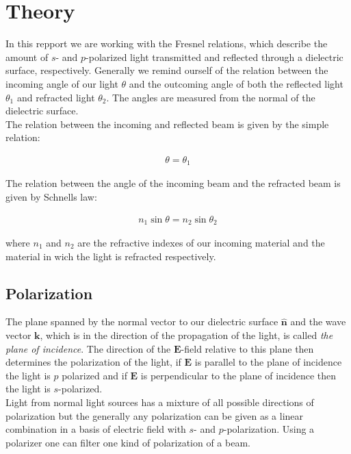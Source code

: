 \section{Theory}
In this repport we are working with the Fresnel relations, which describe the amount of $s$- and $p$-polarized light transmitted and reflected through a dielectric surface, respectively. Generally we remind ourself of the relation between the incoming angle of our light $\theta$ and the outcoming angle of both the reflected light $\theta_1$ and refracted light $\theta_2$. The angles are measured from the normal of the dielectric surface.\\

The relation between the incoming and reflected beam is given by the simple relation:

\begin{align}
\theta=\theta_1
\end{align}

The relation between the angle of the incoming beam and the refracted beam is given by Schnells law:

\begin{align}
n_1\sin{\theta}=n_2\sin{\theta_2}
\end{align}

where $n_1$ and $n_2$ are the refractive indexes of our incoming material and the material in wich the light is refracted respectively. 

\subsection{Polarization}

The plane spanned by the normal vector to our dielectric surface $\hat{\textbf{n}}$ and the wave vector $\textbf{k}$, which is in the direction of the propagation of the light, is called \textit{the plane of incidence}. The direction of the $\textbf{E}$-field relative to this plane then determines the polarization of the light, if $\textbf{E}$ is parallel to the plane of incidence the light is $p$ polarized and if $\textbf{E}$ is perpendicular to the plane of incidence then the light is $s$-polarized. \\


Light from normal light sources has a mixture of all possible directions of polarization but the generally any polarization can be given as a linear combination in a basis of electric field with $s$- and $p$-polarization. Using a polarizer one can filter one kind of polarization of a beam.

